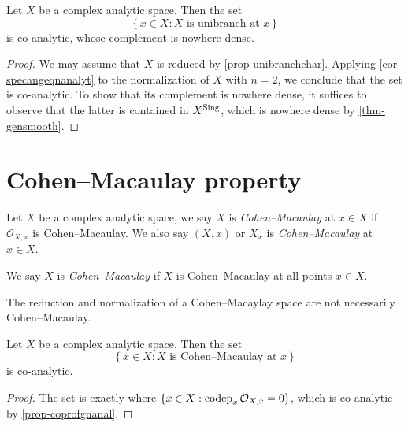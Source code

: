 \begin{corollary}
    Let $X$ be a complex analytic space. Then the set 
    \[
        \left\{ x\in X : X \text{ is unibranch at }x \right\}  
    \]
    is co-analytic, whose complement is nowhere dense.
\end{corollary}
\begin{proof}
    We may assume that $X$ is reduced by \cref{prop-unibranchchar}. 
    Applying \cref{cor-specangeqnanalyt} to the normalization of $X$ with $n=2$, we conclude that the set is co-analytic. To show that its complement is nowhere dense, it suffices to observe that the latter is contained in $X^{\operatorname{Sing}}$, which is nowhere dense by \cref{thm-gensmooth}.
\end{proof}
\fi

\section{Cohen--Macaulay property}
\begin{definition}
    Let $X$ be a complex analytic space, we say $X$ is \emph{Cohen--Macaulay} at $x\in X$ if $\mathcal{O}_{X,x}$ is Cohen--Macaulay. We also say $(X,x)$ or $X_x$ is \emph{Cohen--Macaulay} at $x\in X$.

    We say $X$ is \emph{Cohen--Macaulay} if $X$ is Cohen--Macaulay at all points $x\in X$. 
\end{definition}



The reduction and normalization of a Cohen--Macaylay space are not necessarily Cohen--Macaulay.

\begin{thm}
    Let $X$ be a complex analytic space. Then the set
    \[
        \left\{ x\in X: X\text{ is Cohen--Macaulay at }x \right\}  
    \]
    is co-analytic.
\end{thm}
\begin{proof}
    The set is exactly where $\{x\in X:\operatorname{codep}_x \mathcal{O}_{X,x}=0\}$, which is co-analytic by \cref{prop-coprofgnanal}.
\end{proof}

\printbibliography
